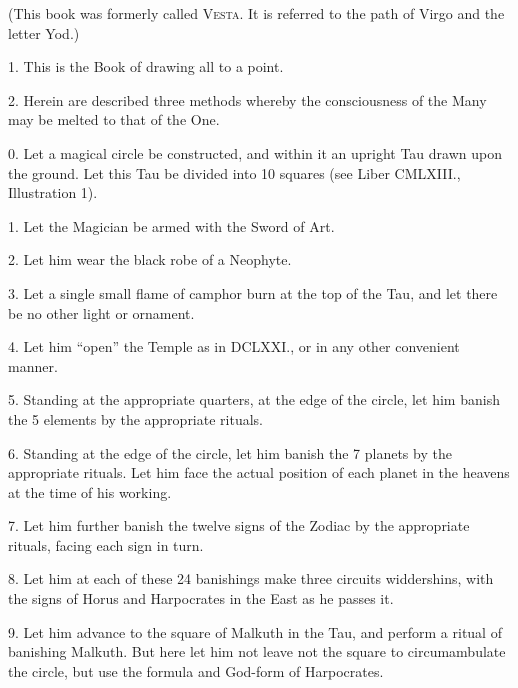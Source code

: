 

(This book was formerly called \textsc{Vesta}. It is referred to the path of Virgo and the letter Yod.)


1. This is the Book of drawing all to a point.

2. Herein are described three methods whereby the consciousness of the Many may be melted to that of the One.



0. Let a magical circle be constructed, and within it an upright Tau drawn upon the ground. Let this Tau be divided into 10 squares (see Liber CMLXIII., Illustration 1).

1. Let the Magician be armed with the Sword of Art.\footnotemark

2. Let him wear the black robe of a Neophyte.

3. Let a single small flame of camphor burn at the top of the Tau, and let there be no other light or ornament.\footnotemark[\value{footnote}]

4. Let him \enquote{open} the Temple as in DCLXXI., or in any other convenient manner.

5. Standing at the appropriate quarters, at the edge of the circle, let him banish the 5 elements by the appropriate rituals.

6. Standing at the edge of the circle, let him banish the 7 planets by the appropriate rituals. Let him face the actual position of each planet in the heavens at the time of his working.

7. Let him further banish the twelve signs of the Zodiac by the appropriate rituals, facing each sign in turn.

8. Let him at each of these 24 banishings make three circuits widdershins, with the signs of Horus and Harpocrates in the East as he passes it.

9. Let him advance to the square of Malkuth in the Tau, and perform a ritual of banishing Malkuth. But here let him not leave not the square to circumambulate the circle, but use the formula and God-form of Harpocrates.

